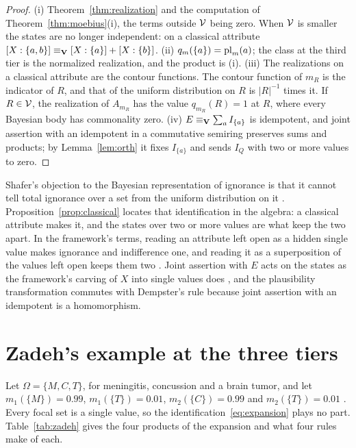 \begin{proof}
(i) Theorem~\ref{thm:realization} and the computation of Theorem~\ref{thm:moebius}(i), the terms outside $\mathcal{V}$ being zero. When $\mathcal{V}$ is smaller the states are no longer independent: on a classical attribute $[X:\{a,b\}] \equiv_{\mathbf{V}} [X:\{a\}] + [X:\{b\}]$. (ii) $q_m(\{a\}) = \mathrm{pl}_m(a)$; the class at the third tier is the normalized realization, and the product is (i). (iii) The realizations on a classical attribute are the contour functions. The contour function of $m_R$ is the indicator of $R$, and that of the uniform distribution on $R$ is $|R|^{-1}$ times it. If $R \in \mathcal{V}$, the realization of $A_{m_R}$ has the value $q_{m_R}(R) = 1$ at $R$, where every Bayesian body has commonality zero. (iv) $E \equiv_{\mathbf{V}} \sum_a I_{\{a\}}$ is idempotent, and joint assertion with an idempotent in a commutative semiring preserves sums and products; by Lemma~\ref{lem:orth} it fixes $I_{\{a\}}$ and sends $I_Q$ with two or more values to zero.
\end{proof}

Shafer's objection to the Bayesian representation of ignorance is that it cannot tell total ignorance over a set from the uniform distribution on it \cite{shafer1976}. Proposition~\ref{prop:classical} locates that identification in the algebra: a classical attribute makes it, and the states over two or more values are what keep the two apart. In the framework's terms, reading an attribute left open as a hidden single value makes ignorance and indifference one, and reading it as a superposition of the values left open keeps them two \cite{AethusTree, AethusBrief}. Joint assertion with $E$ acts on the states as the framework's carving of $X$ into single values does \cite{Aethus}, and the plausibility transformation commutes with Dempster's rule because joint assertion with an idempotent is a homomorphism.

\section{Zadeh's example at the three tiers}\label{sec:zadeh}

Let $\Omega = \{M, C, T\}$, for meningitis, concussion and a brain tumor, and let $m_1(\{M\}) = 0.99$, $m_1(\{T\}) = 0.01$, $m_2(\{C\}) = 0.99$ and $m_2(\{T\}) = 0.01$ \cite{zadeh1984}. Every focal set is a single value, so the identification~\eqref{eq:expansion} plays no part. Table~\ref{tab:zadeh} gives the four products of the expansion and what four rules make of each.

